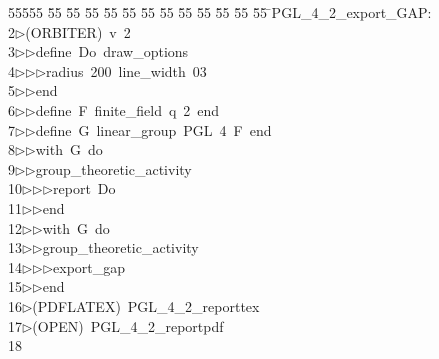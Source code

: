 %
%
\begin{tabbing}
55555 \= 55 \= 55 \= 55 \= 55 \= 55 \= 55 \= 55 \= 55 \= 55 \= 55 \= 55 \= 55 \= \>PGL\_4\_2\_export\_GAP:\\[0pt]
2\>$\triangleright$\>(ORBITER)\ v\ 2\ \\[0pt]
3\>$\triangleright$\>$\triangleright$\>define\ Do\ draw\_options\ \\[0pt]
4\>$\triangleright$\>$\triangleright$\>$\triangleright$\>radius\ 200\ line\_width\ 03\ \\[0pt]
5\>$\triangleright$\>$\triangleright$\>end\ \\[0pt]
6\>$\triangleright$\>$\triangleright$\>define\ F\ finite\_field\ q\ 2\ end\ \\[0pt]
7\>$\triangleright$\>$\triangleright$\>define\ G\ linear\_group\ PGL\ 4\ F\ end\ \\[0pt]
8\>$\triangleright$\>$\triangleright$\>with\ G\ do\ \\[0pt]
9\>$\triangleright$\>$\triangleright$\>group\_theoretic\_activity\ \\[0pt]
10\>$\triangleright$\>$\triangleright$\>$\triangleright$\>report\ Do\ \\[0pt]
11\>$\triangleright$\>$\triangleright$\>end\ \\[0pt]
12\>$\triangleright$\>$\triangleright$\>with\ G\ do\ \\[0pt]
13\>$\triangleright$\>$\triangleright$\>group\_theoretic\_activity\ \\[0pt]
14\>$\triangleright$\>$\triangleright$\>$\triangleright$\>export\_gap\ \\[0pt]
15\>$\triangleright$\>$\triangleright$\>end\\[0pt]
16\>$\triangleright$\>(PDFLATEX)\ PGL\_4\_2\_reporttex\\[0pt]
17\>$\triangleright$\>(OPEN)\ PGL\_4\_2\_reportpdf\\[0pt]
18\>\end{tabbing}
